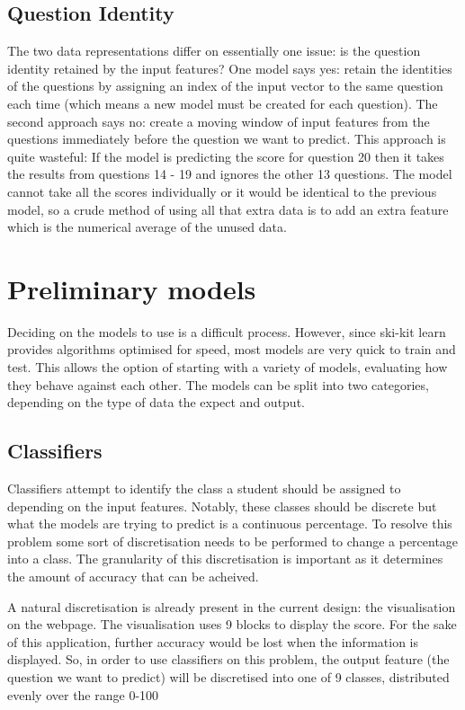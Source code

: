 \subsection{Question Identity}
The two data representations differ on essentially one issue: is the question identity retained by the input features? One model says yes: retain the identities of the questions by assigning an index of the input vector to the same question each time (which means a new model must be created for each question). The second approach says no: create a moving window of input features from the questions immediately before the question we want to predict. This approach is quite wasteful: If the model is predicting the score for question 20 then it takes the results from questions 14 - 19 and ignores the other 13 questions. The model cannot take all the scores individually or it would be identical to the previous model, so a crude method of using all that extra data is to add an extra feature which is the numerical average of the unused data.

\section{Preliminary models}
Deciding on the models to use is a difficult process. However, since ski-kit learn provides algorithms optimised for speed, most models are very quick to train and test. This allows the option of starting with a variety of models, evaluating how they behave against each other. The models can be split into two categories, depending on the type of data the expect and output.

\subsection{Classifiers}
Classifiers attempt to identify the class a student should be assigned to depending on the input features. Notably, these classes should be discrete but what the models are trying to predict is a continuous percentage. To resolve this problem some sort of discretisation needs to be performed to change a percentage into a class. The granularity of this discretisation is important as it determines the amount of accuracy that can be acheived. 

A natural discretisation is already present in the current design: the visualisation on the webpage. The visualisation uses 9 blocks to display the score. For the sake of this application, further accuracy would be lost when the information is displayed. So, in order to use classifiers on this problem, the output feature (the question we want to predict) will be discretised into one of 9 classes, distributed evenly over the range 0-100%

